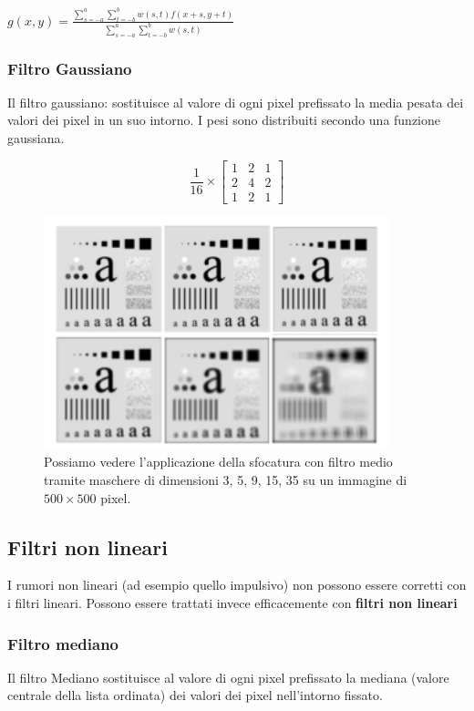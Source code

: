 \begin{center}
    $g(x,y)=\frac{\sum_{s=-a}^{a}\sum_{t=-b}^{b}w(s,t)f(x+s,y+t)}{\sum_{s=-a}^{a}\sum_{t=-b}^{b}w(s,t)}$
\end{center}

\subsubsection{Filtro Gaussiano}
Il filtro gaussiano: sostituisce al valore di ogni pixel prefissato la
media pesata dei valori dei pixel in un suo intorno. I pesi sono distribuiti secondo una funzione gaussiana.

\[
    \frac{1}{16} \times
    \begin{bmatrix}
        1 & 2 & 1 \\
        2 & 4 & 2 \\
        1 & 2 & 1
    \end{bmatrix}
\]

\begin{figure}[H]
    \centering
    \includegraphics[width=10cm, keepaspectratio]{capitoli/immagini/imgs/filtri-l-esempio.png}
    \caption{Possiamo vedere l'applicazione della sfocatura con filtro medio
        tramite maschere di dimensioni 3, 5, 9, 15, 35 su un immagine di $500 \times 500$ pixel.}
\end{figure}

\subsection{Filtri non lineari}
I rumori non lineari (ad esempio quello impulsivo) non possono essere corretti con i filtri lineari.
Possono essere trattati invece efficacemente con \textbf{filtri non lineari}
\subsubsection{Filtro mediano}
Il filtro Mediano sostituisce al valore di ogni pixel prefissato la
mediana (valore centrale della lista ordinata) dei
valori dei pixel nell'intorno fissato.

